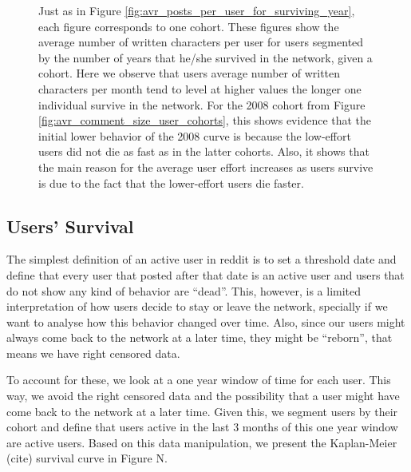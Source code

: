 \begin{figure}[!tb]
\caption{Just as in Figure \ref{fig:avr_posts_per_user_for_surviving_year}, each figure corresponds to one cohort. These figures show the average number of written characters per user for users segmented by the number of years that he/she survived in the network, given a cohort. Here we observe that users average number of written characters per month tend to level at higher values the longer one individual survive in the network. For the 2008 cohort from Figure \ref{fig:avr_comment_size_user_cohorts}, this shows evidence that the initial lower behavior of the 2008 curve is because the low-effort users did not die as fast as in the latter cohorts. Also, it shows that the main reason for the average user effort increases as users survive is due to the fact that the lower-effort users die faster.}
\label{fig:avr_comment_length_user_for_surviving_year}
\end{figure}


\subsection{Users' Survival}

The simplest definition of an active user in reddit is to set a threshold date and define that every user that posted after that date is an active user and users that do not show any kind of behavior are ``dead''. This, however, is a limited interpretation of how users decide to stay or leave the network, specially if we want to analyse how this behavior changed over time. Also, since our users might always come back to the network at a later time, they might be ``reborn'', that means we have right censored data.

To account for these, we look at a one year window of time for each user. This way, we avoid the right censored data and the possibility that a user might have come back to the network at a later time. Given this, we segment users by their cohort and define that users active in the last 3 months of this one year window are active users. Based on this data manipulation, we present the Kaplan-Meier (cite) survival curve in Figure N.

